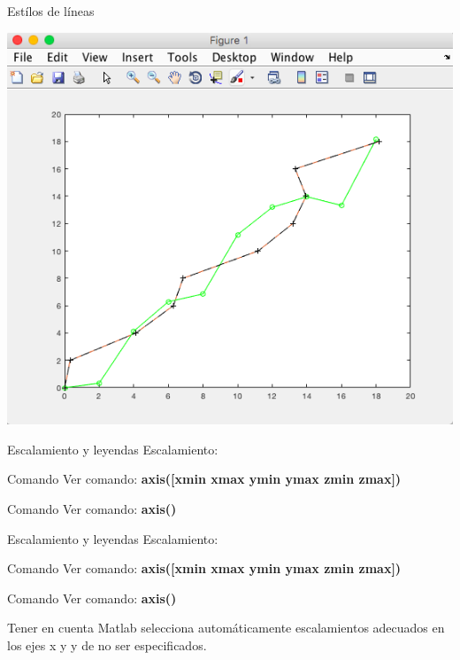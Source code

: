 \documentclass{bredelebeamer}
\begin{document}
\begin{frame}{Estílos de líneas}
\begin{center}
\includegraphics[scale=0.35]{images/pantalla17.png}
\end{center}
\end{frame}

\begin{frame}{Escalamiento y leyendas}
Escalamiento:\\
\begin{exampleblock}{Comando}
Ver comando: \textbf{axis([xmin xmax ymin ymax zmin zmax])}
\end{exampleblock}
\begin{exampleblock}{Comando}
Ver comando: \textbf{axis()}
\end{exampleblock}
\end{frame}

\begin{frame}{Escalamiento y leyendas}
Escalamiento:\\
\begin{exampleblock}{Comando}
Ver comando: \textbf{axis([xmin xmax ymin ymax zmin zmax])}
\end{exampleblock}
\begin{exampleblock}{Comando}
Ver comando: \textbf{axis()}
\end{exampleblock}
\begin{alertblock}{Tener en cuenta}
Matlab selecciona automáticamente escalamientos adecuados en los ejes x y y de no ser especificados.
\end{alertblock}
\end{frame}
\end{document}
